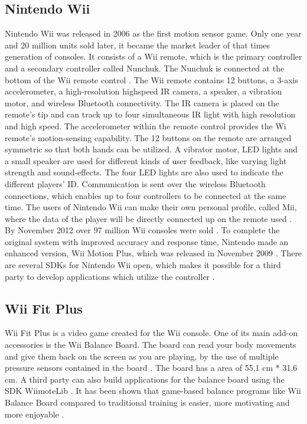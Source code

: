 \subsection{Nintendo Wii}
Nintendo Wii was released in 2006 as the first motion sensor game. Only one year and 20 million units sold later, it became the market leader of that times generation of consoles. It consists of a Wii remote, which is the primary controller and a secondary controller called Nunchuk. The Nunchuk is connected at the bottom of the Wii remote control \cite{hackingwii}. The Wii remote contains 12 buttons, a 3-axis accelerometer, a high-resolution highspeed IR camera, a speaker, a vibration motor, and wireless Bluetooth connectivity.
The IR camera is placed on the remote's tip and can track up to four simultaneous IR light with high resolution and high speed. The accelerometer within the remote control provides the Wi remote’s motion-sensing capability. The 12 buttons on the remote are arranged symmetric so that both hands can be utilized. A vibrator motor, LED lights and a small speaker are used for different kinds of user feedback, like varying light strength and sound-effects. The four LED lights are also used to indicate the different players' ID. Communication is sent over the wireless Bluetooth connections, which enables up to four controllers to be connected at the same time.  The users of Nintendo Wii can make their own personal profile, called Mii, where the data of the player will be directly connected up on the remote used  \cite{hackingwii} \cite{whatiswii}. By November 2012 over 97 million Wii consoles were sold \cite{vgchartzhardware}.  To complete the original system with improved accuracy and response time, Nintendo made an enhanced version, Wii Motion Plus, which was released in November 2009 \cite{consoles}. There are several SDKs for Nintendo Wii open, which makes it possible for a third party to develop applications which utilize the controller \cite{comparison}. 

\subsection{Wii Fit Plus}
Wii Fit Plus is a video game created for the Wii console. One of its main add-on accessories is the Wii Balance Board. The board can read your body movements and give them back on the screen as you are playing, by the use of multiple pressure sensors contained in the board \cite{whatiswiifit}. The board has a area of 55,1 cm {*} 31,6 cm. A third party can also build applications for the balance board using the SDK WiimoteLib \cite{comparison}. It has been shown that game-based balance programs like Wii Balance Board compared to traditional training is easier, more motivating and more enjoyable \cite{taylor2011activity}.


